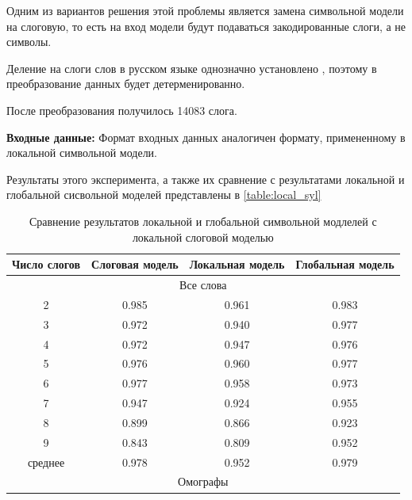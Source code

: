 \documentclass[14pt, a4paper, russian]{report}
\begin{document}
\begin{normalsize}
Одним из вариантов решения этой проблемы является замена символьной модели на слоговую, то есть на вход модели будут подаваться закодированные слоги, а не символы.

Деление на слоги слов в русском языке однозначно установлено \cite{litnevskaya}, поэтому в преобразование данных будет детерменированно. 

После преобразования получилось 14083 слога.

\textbf{Входные данные:} Формат входных данных аналогичен формату, примененному в локальной символьной модели.

Результаты этого эксперимента, а также их сравнение с результатами локальной и глобальной сисвольной моделей представлены в \cref{table:local_syl}

\begin{table}[H]
		\caption{Сравнение результатов локальной и глобальной символьной модлелей с локальной слоговой моделью}
	
	\begin{small}
		\begin{center}
			\begin{tabular}{|c|c|c|c|}
				\hline
				Число слогов & Слоговая модель & Локальная модель & Глобальная модель \\ \hline
				\multicolumn{4}{|c|}{Все слова}                                       \\ \hline
				     2       &      0.985      &      0.961       & 0.983             \\ \hline
				     3       &      0.972      &      0.940       & 0.977             \\ \hline
				     4       &      0.972      &      0.947       & 0.976             \\ \hline
				     5       &      0.976      &      0.960       & 0.977             \\ \hline
				     6       &      0.977      &      0.958       & 0.973             \\ \hline
				     7       &      0.947      &      0.924       & 0.955             \\ \hline
				     8       &      0.899      &      0.866       & 0.923             \\ \hline
				     9       &      0.843      &      0.809       & 0.952             \\ \hline
				  среднее    &      0.978      &      0.952       & 0.979             \\ \hline
				  \multicolumn{4}{|c|}{Омографы}                                        \\ \hline
				  

\end{tabular}
\end{center}
\end{small}
\end{table}
\end{normalsize}
\end{document}
